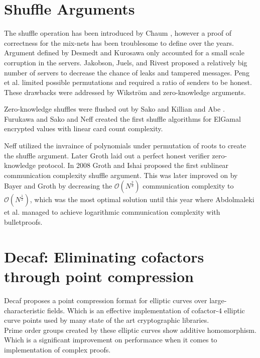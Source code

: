 \documentclass[12pt,a4paper]{report}
\begin{document}
\section{Shuffle Arguments}
The shuffle operation has been introduced by Chaum \cite{cha81}, however a proof of correctness for the mix-nets has been troublesome to define over the years.
Argument defined by Desmedt and Kurosawa \cite{dk00} only accounted for a small scale corruption in the servers. Jakobson, Juels, and Rivest \cite{jjr02} proposed a relatively big number of servers to decrease the chance of leaks and tampered messages. 
Peng et al. \cite{pbdv04} limited possible permutations and required a ratio of senders to be honest. 
These drawbacks were addressed by Wikström \cite{wik02} and zero-knowledge arguments.\par
Zero-knowledge shuffles were flushed out by Sako and Killian \cite{sk95} and Abe \cite{abe98, abe99, ah01}. 
Furukawa and Sako \cite{fs01} and Neff \cite{nef01, nef03} created the first shuffle algorithms for ElGamal encrypted values with linear card count complexity.\par
Neff \cite{nef01} utilized the invraince of polynomials under permutation of roots to create the shuffle argument. Later Groth \cite{gro10} laid out a perfect honest verifier zero-knowledge protocol.
In 2008 Groth and Ishai \cite{gi08} proposed the first sublinear communication complexity shuffle argument. 
This was later improved on by Bayer and Groth \cite{bgshuffle} by decreasing the $\mathcal{O}(N^{\frac{2}{3}})$ communication complexity to $\mathcal{O}(N^{\frac{1}{2}})$, 
which was the most optimal solution until this year where Abdolmaleki et al. \cite{bpshuffle} managed to achieve logarithmic communication complexity with bulletproofs.\par

\section{Decaf: Eliminating cofactors through point compression}
Decaf\cite{decaf} proposes a point compression format for elliptic curves over 
large-characteristic fields. Which is an effective implementation of cofactor-4 elliptic curve points
used by many state of the art cryptographic libraries.\\
Prime order groups created by these elliptic curves show additive homomorphism. Which is a significant
improvement on performance when it comes to implementation of complex proofs.
\end{document}
